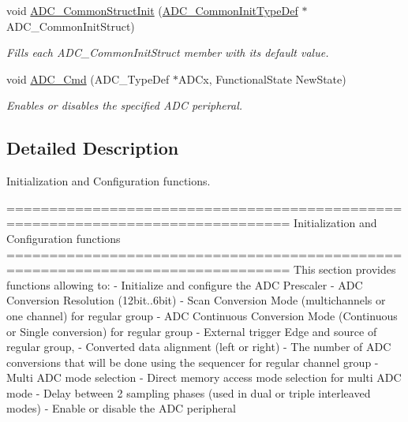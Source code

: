 \begin{DoxyCompactItemize}
void \hyperlink{group___a_d_c___group1_gad60a6414b4932c704f6f7a7c2963fa2a}{A\-D\-C\-\_\-\-Common\-Struct\-Init} (\hyperlink{struct_a_d_c___common_init_type_def}{A\-D\-C\-\_\-\-Common\-Init\-Type\-Def} $\ast$A\-D\-C\-\_\-\-Common\-Init\-Struct)
\begin{DoxyCompactList}\small\item\em Fills each A\-D\-C\-\_\-\-Common\-Init\-Struct member with its default value. \end{DoxyCompactList}\item 
void \hyperlink{group___a_d_c___group1_ga40882d399e3371755ed610c1134e634e}{A\-D\-C\-\_\-\-Cmd} (A\-D\-C\-\_\-\-Type\-Def $\ast$A\-D\-Cx, Functional\-State New\-State)
\begin{DoxyCompactList}\small\item\em Enables or disables the specified A\-D\-C peripheral. \end{DoxyCompactList}\end{DoxyCompactItemize}


\subsection{Detailed Description}
Initialization and Configuration functions. \begin{DoxyVerb} ===============================================================================
                      Initialization and Configuration functions
 ===============================================================================  
  This section provides functions allowing to:
   - Initialize and configure the ADC Prescaler
   - ADC Conversion Resolution (12bit..6bit)
   - Scan Conversion Mode (multichannels or one channel) for regular group
   - ADC Continuous Conversion Mode (Continuous or Single conversion) for 
     regular group
   - External trigger Edge and source of regular group, 
   - Converted data alignment (left or right)
   - The number of ADC conversions that will be done using the sequencer for 
     regular channel group
   - Multi ADC mode selection
   - Direct memory access mode selection for multi ADC mode  
   - Delay between 2 sampling phases (used in dual or triple interleaved modes)
   - Enable or disable the ADC peripheral\end{DoxyVerb}
 

